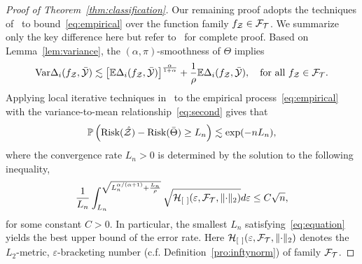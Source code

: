\documentclass[11pt]{article}
\theoremstyle{plain}
\theoremstyle{definition}
\def\risk{\textup{Risk}}
\begin{document}
\begin{proof}[Proof of Theorem~\ref{thm:classification}]
Our remaining proof adopts the techniques of~\citet[Theorem 3]{wang2008probability} to bound~\eqref{eq:empirical} over the function family $f_{\mathcal{Z}}\in \mathcal{F}_{\mathcal{T}}$. We summarize only the key difference here but refer to~\cite{wang2008probability} for complete proof. 
Based on Lemma~\ref{lem:variance}, the $(\alpha,\pi)$-smoothness of $\Theta$ implies 
\begin{equation}\label{eq:second}
\textup{Var}\Delta_i(f_{\mathcal{Z}},\bar {\mathcal{Y}}) \lesssim \left[\mathbb{E}\Delta_i(f_{\mathcal{Z}},\bar {\mathcal{Y}})\right]^{\alpha \over 1+\alpha}+{1\over \rho}\mathbb{E}\Delta_i(f_{\mathcal{Z}},\bar {\mathcal{Y}}),\quad \text{for all $f_{\mathcal{Z}}\in \mathcal{F}_{\mathcal{T}}$}.
\end{equation}
Applying local iterative techniques in~\citet[Theorem 3]{wang2008probability} to the empirical process~\eqref{eq:empirical} with the variance-to-mean relationship~\eqref{eq:second} gives that
\begin{equation}\label{eq:rate}
\mathbb{P}\left(\risk(\hat \tZ)-\risk(\bar \Theta )\geq L_n\right)\lesssim \exp(-nL_n),
\end{equation}
where the convergence rate $L_n>0$ is determined by the solution to the following inequality,
\begin{equation}\label{eq:equation}
{1\over L_n}\int_{L_n}^{\sqrt{L_n^{\alpha/(\alpha+1)}+{L_n\over \rho}}}\sqrt{\mathcal{H}_{[\ ]}(\varepsilon,\mathcal{F}_{\mathcal{T}}, \lVert\cdot\rVert_2) }d\varepsilon \leq C\sqrt{n},
\end{equation}
for some constant $C>0$. In particular, the smallest $L_n$ satisfying~\eqref{eq:equation} yields the best upper bound of the error rate. Here $\tH_{[\ ]}(\varepsilon, \tF_{\tT},\vnormSize{}{\cdot})$ denotes the $L_2$-metric, $\varepsilon$-bracketing number (c.f. Definition~\ref{pro:inftynorm}) of family $\mathcal{F}_{\mathcal{T}}$. 


\end{proof}
\end{document}

